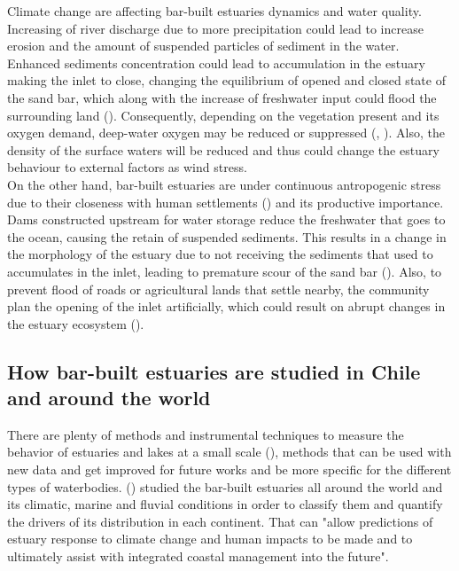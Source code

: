 \documentclass[11pt,letterpaper]{article}
\begin{document}
Climate change are affecting bar-built estuaries dynamics and water quality. Increasing of river discharge due to more precipitation could lead to increase erosion and the amount of suspended particles of sediment in the water. Enhanced sediments concentration could lead to accumulation in the estuary making the inlet to close, changing the equilibrium of opened and closed state of the sand bar, which along with the increase of freshwater input could flood the surrounding land (\cite{peeters2009currents}). Consequently, depending on the vegetation present and its oxygen demand, deep-water oxygen may be reduced or suppressed (\cite{Kelly2018}, \cite{Largier2021}). Also, the density of the surface waters will be reduced and thus could change the estuary behaviour to external factors as wind stress. \\

On the other hand, bar-built estuaries are under continuous antropogenic stress due to their closeness with human settlements (\cite{clark2019systematic}) and its productive importance. Dams constructed upstream for water storage reduce the freshwater that goes to the ocean, causing the retain of suspended sediments. This results in a change in the morphology of the estuary due to not receiving the sediments that used to accumulates in the inlet, leading to premature scour of the sand bar (\cite{peeters2009currents}). Also, to prevent flood of roads or agricultural lands that settle nearby, the community plan the opening of the inlet artificially, which could result on abrupt changes in the estuary ecosystem (\cite{Behrens2013}). \\

\subsection{How bar-built estuaries are studied in Chile and around the world}

There are plenty of methods and instrumental techniques to measure the behavior of estuaries and lakes at a small scale (\cite{Wuest2003}), methods that can be used with new data and get improved for future works and be more specific for the different types of waterbodies. \citeauthor{mcsweeney2017intermittently} (\cite*{mcsweeney2017intermittently}) studied the bar-built estuaries all around the world and its climatic, marine and fluvial conditions in order to classify them and quantify the drivers of its distribution in each continent. That can "allow predictions of estuary response to climate change and human impacts to be made and to ultimately assist with integrated coastal management into the future".\\
\end{document}

